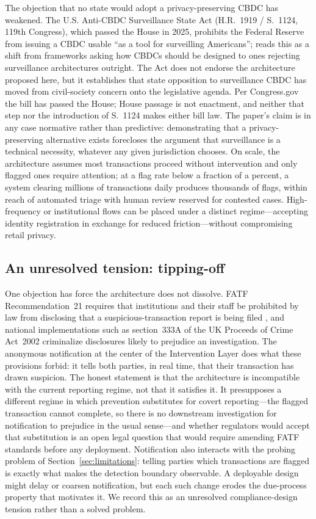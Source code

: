 \documentclass[11pt]{article}
\begin{document}
The objection that no state would adopt a privacy-preserving CBDC has weakened. The U.S. Anti-CBDC
Surveillance State Act (H.R.~1919 / S.~1124, 119th Congress), which passed the House in 2025,
prohibits the Federal Reserve from issuing a CBDC usable ``as a tool for surveilling Americans'';
\citet{Zatti2025} reads this as a shift from frameworks asking how CBDCs should be designed to ones
rejecting surveillance architectures outright. The Act does not endorse the architecture proposed
here, but it establishes that state opposition to surveillance CBDC has moved from civil-society
concern onto the legislative agenda. Per Congress.gov the bill has passed the House; House passage
is not enactment, and neither that step nor the introduction of S.~1124 makes either bill law. The paper's claim is in any case normative rather than predictive:
demonstrating that a privacy-preserving alternative exists forecloses the argument that surveillance is
a technical necessity, whatever any given jurisdiction chooses. On scale, the architecture assumes
most transactions proceed without intervention and only flagged ones require attention; at a flag rate
below a fraction of a percent, a system clearing millions of transactions daily produces thousands of
flags, within reach of automated triage with human review reserved for contested cases. High-frequency
or institutional flows can be placed under a distinct regime---accepting identity registration in
exchange for reduced friction---without compromising retail privacy.

\subsection{An unresolved tension: tipping-off}
\label{sec:tipping-off}

One objection has force the architecture does not dissolve. FATF Recommendation~21 requires that
institutions and their staff be prohibited by law from disclosing that a suspicious-transaction report
is being filed \citep{FATF2012}, and national implementations such as section~333A of the UK Proceeds
of Crime Act~2002 criminalize disclosures likely to prejudice an investigation. The anonymous
notification at the center of the Intervention Layer does what these provisions forbid: it tells both
parties, in real time, that their transaction has drawn suspicion. The honest statement is that the
architecture is incompatible with the current reporting regime, not that it satisfies it. It
presupposes a different regime in which prevention substitutes for covert reporting---the flagged
transaction cannot complete, so there is no downstream investigation for notification to prejudice in
the usual sense---and whether regulators would accept that substitution is an open legal question that
would require amending FATF standards before any deployment. Notification also interacts with the
probing problem of Section~\ref{sec:limitations}: telling parties which transactions are flagged is
exactly what makes the detection boundary observable. A deployable design might delay or coarsen
notification, but each such change erodes the due-process property that motivates it. We record this
as an unresolved compliance-design tension rather than a solved problem.
\end{document}
